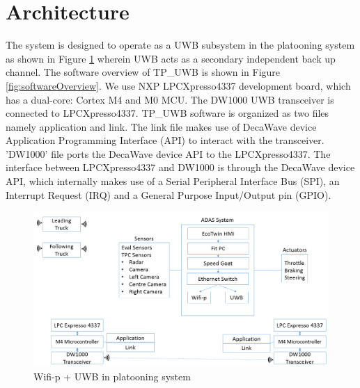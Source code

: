 \section{Architecture}
The system is designed to operate as a UWB subsystem in the platooning system as shown in Figure \ref{fig:integrationOfUWBToExistingSystem} wherein UWB acts as a secondary independent back up channel.
The software overview of TP\_UWB is shown in Figure \ref{fig:softwareOverview}. We use NXP LPCXpresso4337 development board, which has a dual-core: Cortex M4 and M0 MCU. The DW1000 UWB transceiver is connected to LPCXpresso4337. TP\_UWB software is organized as two files namely application and link. The link file makes use of DecaWave device Application Programming Interface (API) to interact with the transceiver. 'DW1000' file ports the DecaWave device API to the LPCXpresso4337. The interface between LPCXpresso4337 and DW1000 is through the DecaWave device API, which internally makes use of a Serial Peripheral Interface Bus (SPI), an Interrupt Request (IRQ) and a General Purpose Input/Output pin (GPIO).
\begin{figure}[h!]
	\includegraphics[width=1\textwidth]{figures/IntegrationOfUWBtoExistingSystem}
	\centering
	\caption{Wifi-p + UWB in platooning system}
	\label{fig:integrationOfUWBToExistingSystem}    
\end{figure}
